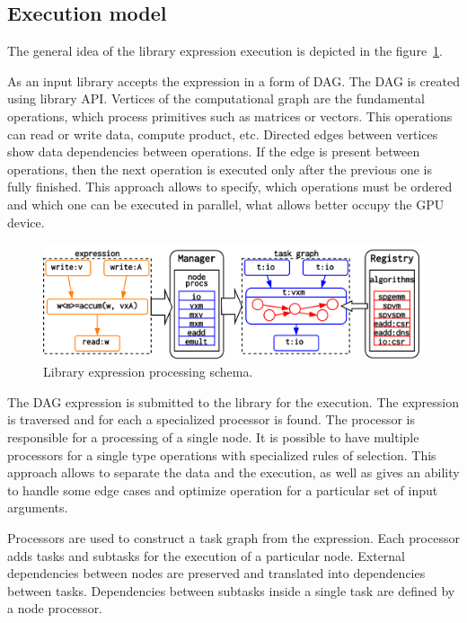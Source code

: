 \subsection{Execution model}

The general idea of the library expression execution is depicted in the figure~\ref{fig:execution_schema}.

As an input library accepts the expression in a form of DAG. The DAG is created using library API. Vertices of the computational graph are the fundamental operations, which process primitives such as matrices or vectors. This operations can read or write data, compute product, etc. Directed edges between vertices show data dependencies between operations. If the edge is present between operations, then the next operation is executed only after the previous one is fully finished. This approach allows to specify, which operations must be ordered and which one can be executed in parallel, what allows better occupy the GPU device.

\begin{figure}[ht]
    \centering
    \includegraphics[width=1.0\textwidth]{images/execution_schema.png}
    \caption{Library expression processing schema.}
    \label{fig:execution_schema}
\end{figure}

The DAG expression is submitted to the library for the execution. The expression is traversed and for each a specialized processor is found. The processor is responsible for a processing of a single node. It is possible to have multiple processors for a single type operations with specialized rules of selection. This approach allows to separate the data and the execution, as well as gives an ability to handle some edge cases and optimize operation for a particular set of input arguments.

Processors are used to construct a task graph from the expression. Each processor adds tasks and subtasks for the execution of a particular node. External dependencies between nodes are preserved and translated into dependencies between tasks. Dependencies between subtasks inside a single task are defined by a node processor. 

